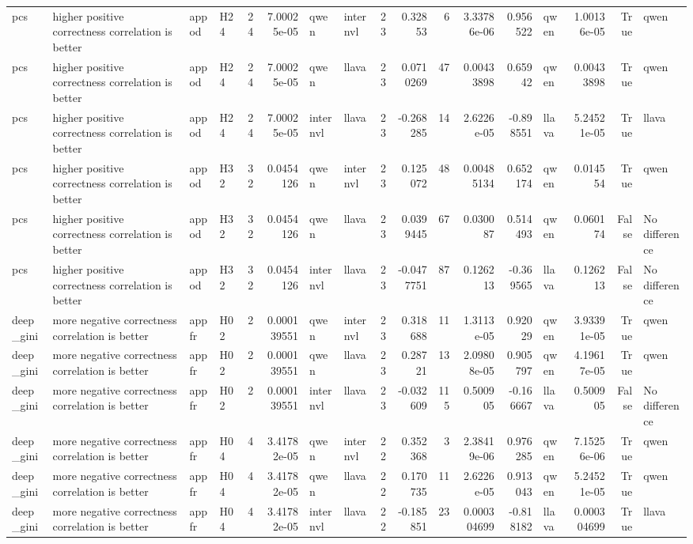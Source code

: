 \begin{longtable}{llllrrllrrrrrlrrl}
pcs & higher positive correctness correlation is better & appod & H24 & 24 & 7.00025e-05 & qwen & internvl & 23 & 0.32853 & 6 & 3.33786e-06 & 0.956522 & qwen & 1.00136e-05 & True & qwen \\
pcs & higher positive correctness correlation is better & appod & H24 & 24 & 7.00025e-05 & qwen & llava & 23 & 0.0710269 & 47 & 0.00433898 & 0.65942 & qwen & 0.00433898 & True & qwen \\
pcs & higher positive correctness correlation is better & appod & H24 & 24 & 7.00025e-05 & internvl & llava & 23 & -0.268285 & 14 & 2.6226e-05 & -0.898551 & llava & 5.24521e-05 & True & llava \\
pcs & higher positive correctness correlation is better & appod & H32 & 32 & 0.0454126 & qwen & internvl & 23 & 0.125072 & 48 & 0.00485134 & 0.652174 & qwen & 0.014554 & True & qwen \\
pcs & higher positive correctness correlation is better & appod & H32 & 32 & 0.0454126 & qwen & llava & 23 & 0.0399445 & 67 & 0.030087 & 0.514493 & qwen & 0.060174 & False & No difference \\
pcs & higher positive correctness correlation is better & appod & H32 & 32 & 0.0454126 & internvl & llava & 23 & -0.0477751 & 87 & 0.126213 & -0.369565 & llava & 0.126213 & False & No difference \\
deep\_gini & more negative correctness correlation is better & appfr & H02 & 2 & 0.000139551 & qwen & internvl & 23 & 0.318688 & 11 & 1.3113e-05 & 0.92029 & qwen & 3.93391e-05 & True & qwen \\
deep\_gini & more negative correctness correlation is better & appfr & H02 & 2 & 0.000139551 & qwen & llava & 23 & 0.28721 & 13 & 2.09808e-05 & 0.905797 & qwen & 4.19617e-05 & True & qwen \\
deep\_gini & more negative correctness correlation is better & appfr & H02 & 2 & 0.000139551 & internvl & llava & 23 & -0.032609 & 115 & 0.500905 & -0.166667 & llava & 0.500905 & False & No difference \\
deep\_gini & more negative correctness correlation is better & appfr & H04 & 4 & 3.41782e-05 & qwen & internvl & 22 & 0.352368 & 3 & 2.38419e-06 & 0.976285 & qwen & 7.15256e-06 & True & qwen \\
deep\_gini & more negative correctness correlation is better & appfr & H04 & 4 & 3.41782e-05 & qwen & llava & 22 & 0.170735 & 11 & 2.6226e-05 & 0.913043 & qwen & 5.24521e-05 & True & qwen \\
deep\_gini & more negative correctness correlation is better & appfr & H04 & 4 & 3.41782e-05 & internvl & llava & 22 & -0.185851 & 23 & 0.000304699 & -0.818182 & llava & 0.000304699 & True & llava \\

\end{longtable}

